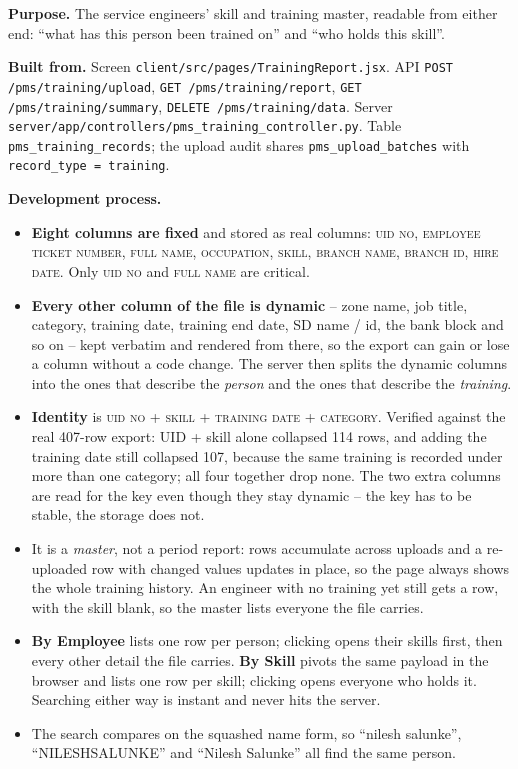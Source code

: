\documentclass[11pt,a4paper]{article}
\newcommand{\purpose}[1]{\textbf{Purpose.} #1\par}
\newcommand{\devproc}{\textbf{Development process.}\par}
\newcommand{\builtfrom}[1]{\textbf{Built from.} #1\par}
\newcommand{\qt}[1]{\textquotedblleft #1\textquotedblright}
\newcommand{\file}[1]{\texttt{\small #1}}
\newcommand{\col}[1]{\textsc{\small #1}}
\begin{document}
\purpose{The service engineers' skill and training master, readable from either end:
\qt{what has this person been trained on} and \qt{who holds this skill}.}

\builtfrom{Screen \file{client/src/pages/TrainingReport.jsx}. API
\texttt{POST /pms/training/upload}, \texttt{GET /pms/training/report},
\texttt{GET /pms/training/summary}, \texttt{DELETE /pms/training/data}. Server
\file{server/app/controllers/pms\_training\_controller.py}. Table
\file{pms\_training\_records}; the upload audit shares \file{pms\_upload\_batches} with
\texttt{record\_type = training}.}

\devproc
\begin{itemize}
  \item \textbf{Eight columns are fixed} and stored as real columns: \col{uid no},
  \col{employee ticket number}, \col{full name}, \col{occupation}, \col{skill},
  \col{branch name}, \col{branch id}, \col{hire date}. Only \col{uid no} and
  \col{full name} are critical.
  \item \textbf{Every other column of the file is dynamic} -- zone name, job title,
  category, training date, training end date, SD name / id, the bank block and so on --
  kept verbatim and rendered from there, so the export can gain or lose a column without
  a code change. The server then splits the dynamic columns into the ones that describe
  the \emph{person} and the ones that describe the \emph{training}.
  \item \textbf{Identity} is \col{uid no} + \col{skill} + \col{training date} +
  \col{category}. Verified against the real 407-row export: UID + skill alone collapsed
  114 rows, and adding the training date still collapsed 107, because the same training is
  recorded under more than one category; all four together drop none. The two extra
  columns are read for the key even though they stay dynamic -- the key has to be stable,
  the storage does not.
  \item It is a \emph{master}, not a period report: rows accumulate across uploads and a
  re-uploaded row with changed values updates in place, so the page always shows the whole
  training history. An engineer with no training yet still gets a row, with the skill
  blank, so the master lists everyone the file carries.
  \item \textbf{By Employee} lists one row per person; clicking opens their skills first,
  then every other detail the file carries. \textbf{By Skill} pivots the same payload in
  the browser and lists one row per skill; clicking opens everyone who holds it. Searching
  either way is instant and never hits the server.
  \item The search compares on the squashed name form, so \qt{nilesh salunke},
  \qt{NILESHSALUNKE} and \qt{Nilesh  Salunke} all find the same person.
\end{itemize}
\end{document}
